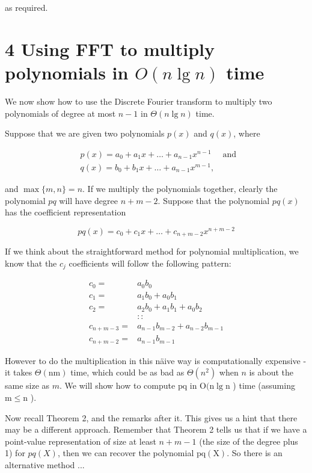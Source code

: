 as required.

\section*{4 Using FFT to multiply polynomials in $O(n \lg n)$ time}
We now show how to use the Discrete Fourier transform to multiply two polynomials of degree at most $n-1$ in $\Theta(n \lg n)$ time.

Suppose that we are given two polynomials $p(x)$ and $q(x)$, where

$$
\begin{aligned}
& p(x)=a_{0}+a_{1} x+\ldots+a_{n-1} x^{n-1} \quad \text { and } \\
& q(x)=b_{0}+b_{1} x+\ldots+a_{n-1} x^{m-1},
\end{aligned}
$$

and $\max \{m, n\}=n$. If we multiply the polynomials together, clearly the polynomial $p q$ will have degree $n+m-2$. Suppose that the polynomial $p q(x)$ has the coefficient representation

$$
p q(x)=c_{0}+c_{1} x+\ldots+c_{n+m-2} x^{n+m-2}
$$

If we think about the straightforward method for polynomial multiplication, we know that the $c_{j}$ coefficients will follow the following pattern:

$$
\begin{aligned}
c_{0}= & a_{0} b_{0} \\
c_{1}= & a_{1} b_{0}+a_{0} b_{1} \\
c_{2}= & a_{2} b_{0}+a_{1} b_{1}+a_{0} b_{2} \\
& :: \\
c_{n+m-3}= & a_{n-1} b_{m-2}+a_{n-2} b_{m-1} \\
c_{n+m-2}= & a_{n-1} b_{m-1}
\end{aligned}
$$

However to do the multiplication in this näive way is computationally expensive - it takes $\Theta(\mathrm{nm})$ time, which could be as bad as $\Theta\left(n^{2}\right)$ when $n$ is about the same size as $m$. We will show how to compute $\mathrm{pq}$ in $\mathrm{O}(\mathrm{n} \lg \mathrm{n}$ ) time (assuming $\mathrm{m} \leq \mathrm{n}$ ).

Now recall Theorem 2, and the remarks after it. This gives us a hint that there may be a different approach. Remember that Theorem 2 tells us that if we have a point-value representation of size at least $n+m-1$ (the size of the degree plus 1) for $p q(X)$, then we can recover the polynomial $\mathrm{pq}(\mathrm{X})$. So there is an alternative method ...

